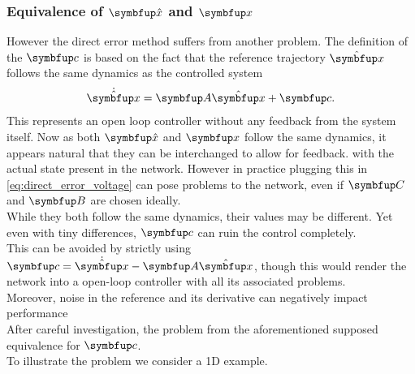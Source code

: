 \subsubsection{Equivalence of $\bmu{\hat{x}}$ and $\bmu{x}$}
However the direct error method suffers from another problem. The definition of the $\bmu{c}$ is based on the fact that the reference trajectory $\hat{\bmu{x}}$ follows the same dynamics as the controlled system
\begin{equation}
	\dot{\hat{\bmu{x}}} = \bmu{A}\hat{\bmu{x}} + \bmu{c}.
\end{equation}
This represents an open loop controller without any feedback from the system itself.
Now as both $\bmu{\hat{x}}$ and $\bmu{x}$ follow the same dynamics, it appears natural that they can be interchanged to allow for feedback. with the actual state present in the network. However in practice plugging this in \cref{eq:direct_error_voltage} can pose problems to the network, even if $\bmu{C}$ and $\bmu{B}$ are chosen ideally.\\
While they both follow the same dynamics, their values may be different. Yet even with tiny differences, $\bmu{c}$ can ruin the control completely.\\

This can be avoided by strictly using $\bmu{c} = \dot{\hat{\bmu{x}}} -\bmu{A}\hat{\bmu{x}}$, though this would render the network into a open-loop controller with all its associated problems.\\
Moreover, noise in the reference and its derivative can negatively impact performance\\
After careful investigation, the problem from the aforementioned supposed equivalence for $\bmu{c}$.\\
To illustrate the problem we consider a 1D example.
